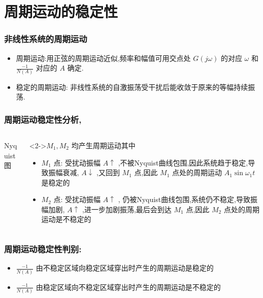 \documentclass[table]{beamer}
\begin{document}
\section{周期运动的稳定性}
\label{sec-4}
\begin{frame}
\frametitle{非线性系统的周期运动}
\label{sec-4-1}

\begin{itemize}
\item 周期运动:用正弦的周期运动近似,频率和幅值可用交点处  $G(j\omega)$ 的对应  $\omega$  和  $\frac{-1}{N(A)}$  对应的  $A$  确定.
\item <2-> 稳定的周期运动: 非线性系统的自激振荡受干扰后能收敛于原来的等幅持续振荡.
\end{itemize}
\end{frame}
\begin{frame}
\frametitle{周期运动稳定性分析,}
\label{sec-4-2}
\begin{columns}
\begin{column}{0.5\textwidth}
\begin{block}{Nyquist图}
\label{sec-4-2-1}

\end{block}
\end{column}
\begin{column}{0.5\textwidth}
\begin{block}<2->{$M_1,M_2$  均产生周期运动其中}
\label{sec-4-2-2}

\begin{itemize}
\item <2->$M_1$  点: 受扰动振幅  $A\uparrow$  ,不被Nyquist曲线包围,因此系统趋于稳定,导致振幅衰减, $A\downarrow$ ,又回到  $M_1$  点,因此  $M_1$  点处的周期运动  $A_1\sin\omega_1 t$  是稳定的
\item <3->$M_2$  点: 受扰动振幅  $A\uparrow$  , 仍被Nyquist曲线包围,系统仍不稳定,导致振幅加剧, $A\uparrow$ ,进一步加剧振荡,最后会到达  $M_1$  点,因此  $M_2$  点处的周期运动是不稳定的
\end{itemize}
\end{block}
\end{column}
\end{columns}
\end{frame}
\begin{frame}
\frametitle{周期运动稳定性判别:}
\label{sec-4-3}

\begin{itemize}
\item $\frac{-1}{N(A)}$  由不稳定区域向稳定区域穿出时产生的周期运动是稳定的
\item <2->$\frac{-1}{N(A)}$  由稳定区域向不稳定区域穿出时产生的周期运动是不稳定的
\end{itemize}
\end{frame}
\end{document}
